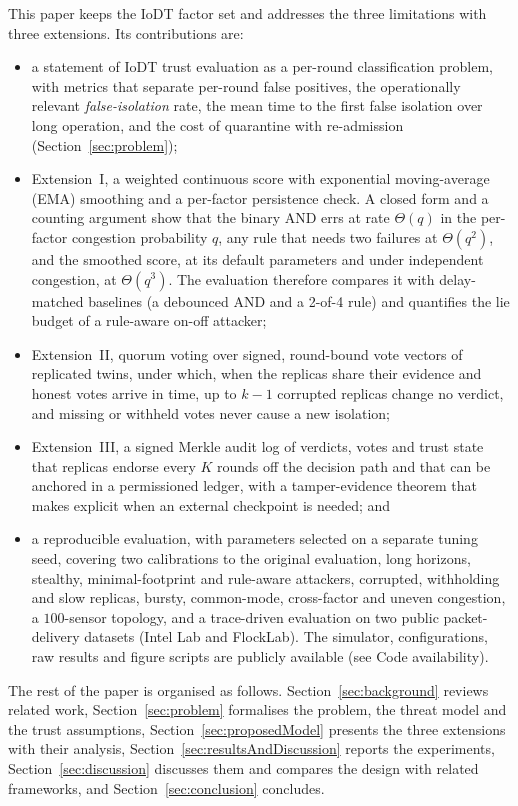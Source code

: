 \documentclass[lineno,pdflatex,sn-nature]{sn-jnl}
\theoremstyle{thmstyleone}%
\theoremstyle{thmstylethree}%
\begin{document}
This paper keeps the IoDT factor set and addresses the three
limitations with three extensions.  Its contributions are:
\begin{itemize}
\item a statement of IoDT trust evaluation as a per-round
classification problem, with metrics that separate per-round false
positives, the operationally relevant \emph{false-isolation} rate,
the mean time to the first false isolation over long operation, and
the cost of quarantine with re-admission (Section~\ref{sec:problem});
\item Extension~I, a weighted continuous score with exponential
moving-average (EMA) smoothing and a per-factor persistence check.
A closed form and a counting argument show that the binary AND errs at
rate $\Theta(q)$ in the per-factor congestion probability $q$, any
rule that needs two failures at $\Theta(q^{2})$, and the smoothed
score, at its default parameters and under independent congestion, at
$\Theta(q^{3})$.  The evaluation therefore compares it with
delay-matched baselines (a debounced AND and a 2-of-4 rule) and
quantifies the lie budget of a rule-aware on-off attacker;
\item Extension~II, quorum voting over signed, round-bound vote
vectors of replicated twins, under which, when the replicas share
their evidence and honest votes arrive in time, up to $k-1$ corrupted
replicas change no verdict, and missing or withheld votes never cause
a new isolation;
\item Extension~III, a signed Merkle audit log of verdicts, votes and
trust state that replicas endorse every $K$ rounds off the decision
path and that can be anchored in a permissioned ledger, with a
tamper-evidence theorem that makes explicit when an external
checkpoint is needed; and
\item a reproducible evaluation, with parameters selected on a
separate tuning seed, covering two calibrations to the original
evaluation, long horizons, stealthy, minimal-footprint and rule-aware
attackers, corrupted, withholding and slow replicas, bursty,
common-mode, cross-factor and uneven congestion, a $100$-sensor
topology, and a trace-driven evaluation on two public packet-delivery
datasets (Intel Lab and FlockLab).  The simulator, configurations, raw results and figure
scripts are publicly available (see Code availability).
\end{itemize}

The rest of the paper is organised as follows.
Section~\ref{sec:background} reviews related work,
Section~\ref{sec:problem} formalises the problem, the threat model and
the trust assumptions, Section~\ref{sec:proposedModel} presents the
three extensions with their analysis, Section~\ref{sec:resultsAndDiscussion}
reports the experiments, Section~\ref{sec:discussion} discusses them
and compares the design with related frameworks, and
Section~\ref{sec:conclusion} concludes.
\end{document}
